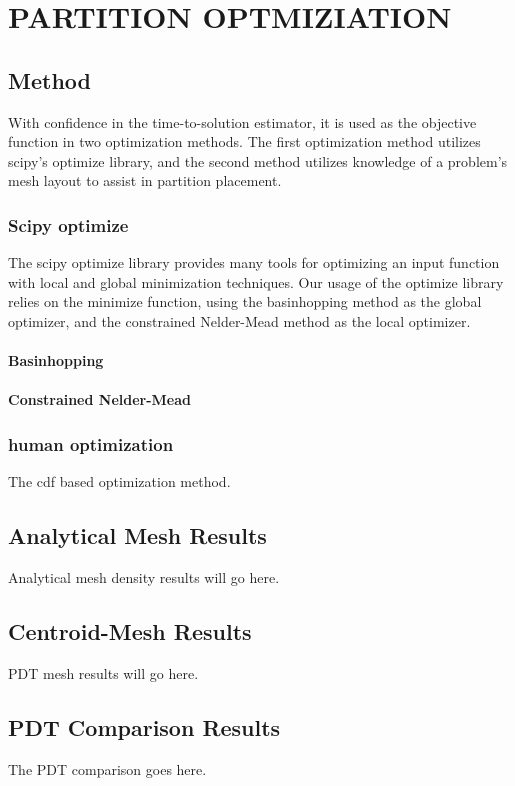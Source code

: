 %
%
%
%



\chapter{PARTITION OPTMIZIATION \label{cha:optimization}}
\section{Method}
With confidence in the time-to-solution estimator, it is used as the objective function in two optimization methods. The first optimization method utilizes scipy's optimize library, and the second method utilizes knowledge of a problem's mesh layout to assist in partition placement.
\subsection{Scipy optimize}
  The scipy optimize library provides many tools for optimizing an input function with local and global minimization techniques. Our usage of the optimize library relies on the minimize function, using the basinhopping method as the global optimizer, and the constrained Nelder-Mead method as the local optimizer.
  
\subsubsection{Basinhopping\cite{basinhoppingwales}}
  
\subsubsection{Constrained Nelder-Mead}
  
\subsection{human optimization}
  The cdf based optimization method.

\section{Analytical Mesh Results}
Analytical mesh density results will go here.

\section{Centroid-Mesh Results}

PDT mesh results will go here.

\section{PDT Comparison Results}

The PDT comparison goes here.